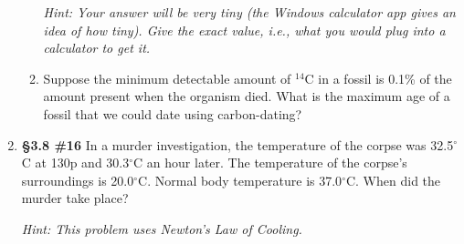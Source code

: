 \documentclass[%
]{article}
\begin{document}
\begin{enumerate}
\begin{enumerate}
	\textit{Hint: Your answer will be very tiny (the Windows calculator app gives an idea of how tiny).  Give the exact value, i.e., what you would plug into a calculator to get it.}
	\item Suppose the minimum detectable amount of $^{14}$C in a fossil is 0.1\% of the amount present when the organism died.  What is the maximum age of a fossil that we could date using carbon-dating?
	\end{enumerate}

\item {\bf \S3.8 \#16} In a murder investigation, the temperature of the corpse was 32.5$^{\circ}$C at 130p and 30.3$^{\circ}$C an hour later.  The temperature of the corpse's surroundings is 20.0$^{\circ}$C.  Normal body temperature is 37.0$^{\circ}$C.  When did the murder take place?

\textit{Hint: This problem uses Newton's Law of Cooling.}

\end{enumerate}
\end{document}
